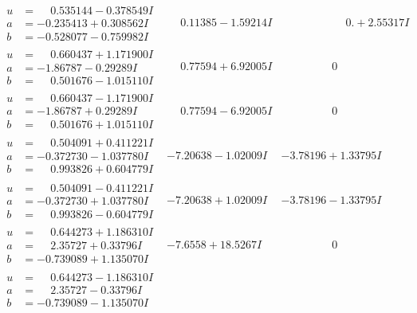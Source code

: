 \documentclass[1p]{elsarticle_modified}
\theoremstyle{definition}
\begin{document}
$$\begin{array}{c|c|c}
\begin{aligned}
u &= \phantom{-}0.535144 - 0.378549 I \\
a &= -0.235413 + 0.308562 I \\
b &= -0.528077 - 0.759982 I\end{aligned}
 & \phantom{-}0.11385 - 1.59214 I & \phantom{-0.000000 -}0. + 2.55317 I \\ \hline\begin{aligned}
u &= \phantom{-}0.660437 + 1.171900 I \\
a &= -1.86787 - 0.29289 I \\
b &= \phantom{-}0.501676 - 1.015110 I\end{aligned}
 & \phantom{-}0.77594 + 6.92005 I & \phantom{-0.000000 } 0 \\ \hline\begin{aligned}
u &= \phantom{-}0.660437 - 1.171900 I \\
a &= -1.86787 + 0.29289 I \\
b &= \phantom{-}0.501676 + 1.015110 I\end{aligned}
 & \phantom{-}0.77594 - 6.92005 I & \phantom{-0.000000 } 0 \\ \hline\begin{aligned}
u &= \phantom{-}0.504091 + 0.411221 I \\
a &= -0.372730 - 1.037780 I \\
b &= \phantom{-}0.993826 + 0.604779 I\end{aligned}
 & -7.20638 - 1.02009 I & -3.78196 + 1.33795 I \\ \hline\begin{aligned}
u &= \phantom{-}0.504091 - 0.411221 I \\
a &= -0.372730 + 1.037780 I \\
b &= \phantom{-}0.993826 - 0.604779 I\end{aligned}
 & -7.20638 + 1.02009 I & -3.78196 - 1.33795 I \\ \hline\begin{aligned}
u &= \phantom{-}0.644273 + 1.186310 I \\
a &= \phantom{-}2.35727 + 0.33796 I \\
b &= -0.739089 + 1.135070 I\end{aligned}
 & -7.6558 + 18.5267 I & \phantom{-0.000000 } 0 \\ \hline\begin{aligned}
u &= \phantom{-}0.644273 - 1.186310 I \\
a &= \phantom{-}2.35727 - 0.33796 I \\
b &= -0.739089 - 1.135070 I\end{aligned}

\end{array}$$
\end{document}
